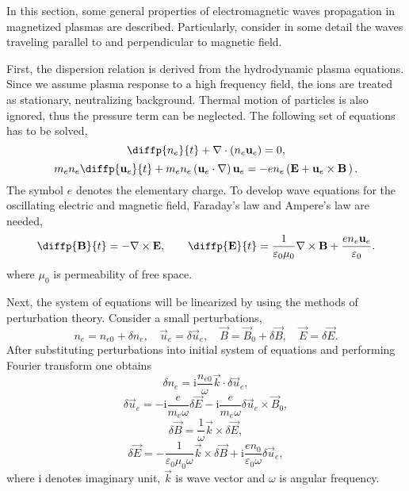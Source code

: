 In this section, some general properties of electromagnetic waves propagation in magnetized plasmas are described. Particularly, consider in some detail the waves traveling parallel to and perpendicular to magnetic field. 

First, the dispersion relation is derived from the hydrodynamic plasma equations. Since we assume plasma response to a high frequency field, the ions are treated as stationary, neutralizing background. Thermal motion of particles is also ignored, thus the pressure term can be neglected. The following set of equations has to be solved,
\begin{equation}
\label{2.3.1}
\diffp{n_e}{t} + \nabla \cdot \left(n_e \vec{u}_e \right) = 0,
\end{equation}
\begin{equation}
\label{2.3.2}
m_e n_e \diffp{\vec{u}_e}{t} + m_e n_e\left(\vec{u}_e \cdot \nabla \right) \vec{u}_e = - e n_e \left(\vec{E} + \vec{u}_e \times \vec{B} \, \right).
\end{equation}
The symbol $ e $ denotes the elementary charge. To develop wave equations for the oscillating electric and magnetic field, Faraday's law and Ampere's law are needed,
\begin{equation}
\label{2.3.3}
\diffp{\vec{B}}{t} = - \nabla \times \vec{E}, \qquad \diffp{\vec{E}}{t} = \frac{1}{\varepsilon_{0} \mu_{0}} \nabla \times \vec{B} + \frac{e n_{e} \vec{u}_{e}}{\varepsilon_{0}}.
\end{equation}
where $ \mu_{0} $ is permeability of free space.

Next, the system of equations will be linearized by using the methods of perturbation theory. Consider a small perturbations,
\begin{equation}
\label{2.3.4}
n_{e} = n_{e0} + \delta n_{e}, \quad \vec{u}_{e} = \delta \vec{u}_{e}, \quad \vec{B} = \vec{B}_{0} + \delta \vec{B}, \quad \vec{E} = \delta \vec{E}.
\end{equation}
After substituting perturbations into initial system of equations and performing Fourier transform one obtains
\begin{equation}
\label{2.3.5}
\delta n_{e} = \mathrm{i} \frac{n_{e0}}{\omega} \vec{k} \cdot \delta \vec{u}_{e},
\end{equation}
\begin{equation}
\label{2.3.6}
\delta \vec{u}_{e} = - \mathrm{i} \frac{e}{m_{e} \omega} \delta \vec{E} - \mathrm{i} \frac{e}{m_{e} \omega} \delta \vec{u}_{e} \times \vec{B}_{0},
\end{equation}
\begin{equation}
\label{2.3.7}
\delta \vec{B} = \frac{1}{\omega} \vec{k} \times \delta \vec{E},
\end{equation}
\begin{equation}
\label{2.3.8}
\delta \vec{E} = - \frac{1}{\varepsilon_{0} \mu_{0} \omega} \vec{k} \times \delta \vec{B} + \mathrm{i} \frac{e n_{0}}{\varepsilon_{0} \omega} \delta \vec{u}_{e},
\end{equation}
where $ \mathrm{i} $ denotes imaginary unit, $ \vec{k} $ is wave vector and $ \omega $ is angular frequency.

